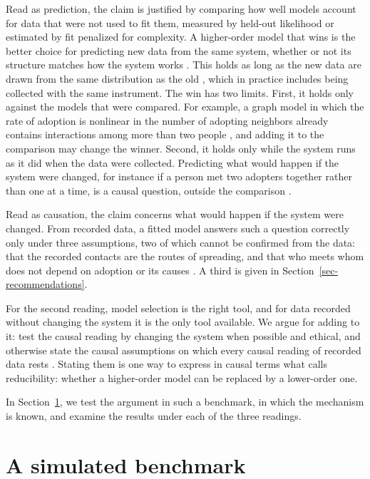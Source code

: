 \documentclass[utf8]{FrontiersinHarvard}
\begin{document}
Read as prediction, the claim is justified by comparing how well models account for data that were not used to fit them, measured by held-out likelihood or estimated by fit penalized for complexity. A higher-order model that wins is the better choice for predicting new data from the same system, whether or not its structure matches how the system works \citep{shmueli2010}. This holds as long as the new data are drawn from the same distribution as the old \citep{breiman2001,sober2002}, which in practice includes being collected with the same instrument. The win has two limits. First, it holds only against the models that were compared. For example, a graph model in which the rate of adoption is nonlinear in the number of adopting neighbors already contains interactions among more than two people \citep{bick2023,peixoto2026}, and adding it to the comparison may change the winner. Second, it holds only while the system runs as it did when the data were collected. Predicting what would happen if the system were changed, for instance if a person met two adopters together rather than one at a time, is a causal question, outside the comparison \citep{hernan2019}.

Read as causation, the claim concerns what would happen if the system were changed. From recorded data, a fitted model answers such a question correctly only under three assumptions, two of which cannot be confirmed from the data: \label{asm-untestable}that the recorded contacts are the routes of spreading, and that who meets whom does not depend on adoption or its causes \citep{pearl2009overview,shalizi2011}. A third is given in Section~\ref{sec-recommendations}.

For the second reading, model selection is the right tool, and for data recorded without changing the system it is the only tool available. We argue for adding to it: test the causal reading by changing the system when possible and ethical, and otherwise state the causal assumptions on which every causal reading of recorded data rests \citep{pearl2009overview}. Stating them is one way to express in causal terms what \citet{perezreche2026} calls reducibility: whether a higher-order model can be replaced by a lower-order one.

In Section~\ref{sec-study}, we test the argument in such a benchmark, in which the mechanism is known, and examine the results under each of the three readings.

\section{A simulated benchmark}\label{sec-study}
\end{document}
